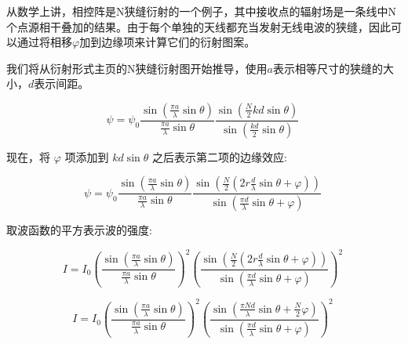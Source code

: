 从数学上讲，相控阵是N狭缝衍射的一个例子，其中接收点的辐射场是一条线中N个点源相干叠加的结果。由于每个单独的天线都充当发射无线电波的狭缝，因此可以通过将相移$\varphi$加到边缘项来计算它们的衍射图案。

我们将从衍射形式主页的N狭缝衍射图开始推导，使用$a$表示相等尺寸的狭缝的大小，$d$表示间距。


$$\psi = \psi_0 \frac{\sin\left( \frac{\pi a}{\lambda} \sin \theta \right)}{\frac{\pi a}{\lambda} \sin \theta} \frac{\sin\left( \frac{N}{2} kd \sin \theta \right)}{\sin \left( \frac{kd}{2} \sin \theta \right)}~$$

现在，将 $\varphi$ 项添加到 $kd \sin \theta$ 之后表示第二项的边缘效应:

$$\psi = \psi_0 \frac{\sin\left( \frac{\pi a}{\lambda} \sin \theta \right)}{\frac{\pi a}{\lambda} \sin \theta} \frac{\sin\left( \frac{N}{2} \left( 2r \frac{d}{\lambda} \sin \theta + \varphi \right) \right)}{\sin \left( \frac{\pi d}{\lambda} \sin \theta + \varphi \right)}~$$

取波函数的平方表示波的强度:

$$I = I_0 \left( \frac{\sin\left( \frac{\pi a}{\lambda} \sin \theta \right)}{\frac{\pi a}{\lambda} \sin \theta} \right)^2 \left( \frac{\sin\left( \frac{N}{2} \left( 2r \frac{d}{\lambda} \sin \theta + \varphi \right) \right)}{\sin \left( \frac{\pi d}{\lambda} \sin \theta + \varphi \right)} \right)^2~$$

$$I = I_0 \left( \frac{\sin\left( \frac{\pi a}{\lambda} \sin \theta \right)}{\frac{\pi a}{\lambda} \sin \theta} \right)^2 \left( \frac{\sin\left( \frac{\pi N d}{\lambda} \sin \theta + \frac{N}{2} \varphi \right)}{\sin \left( \frac{\pi d}{\lambda} \sin \theta + \varphi \right)} \right)^2~$$
